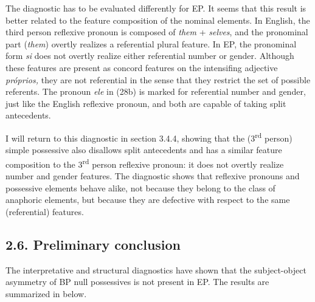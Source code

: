 \documentclass[output=paper]{langsci/langscibook}
\begin{document}
The diagnostic has to be evaluated differently for EP. It seems that this result is better related to the feature composition of the nominal elements. In English, the third person reflexive pronoun is composed of \textit{them} + \textit{selves}, and the pronominal part (\textit{them}) overtly realizes a referential plural feature. In EP, the pronominal form \textit{si} does not overtly realize either referential number or gender. Although these features are present as concord features on the intensifing adjective \textit{próprios,} they are not referential in the sense that they restrict the set of possible referents. The pronoun \textit{ele} in (28b) is marked for referential number and gender, just like the English reflexive pronoun, and both are capable of taking split antecedents.

I will return to this diagnostic in section 3.4.4, showing that the (3\textsuperscript{rd} person) simple possessive also disallows split antecedents and has a similar feature composition to the 3\textsuperscript{rd} person reflexive pronoun: it does not overtly realize number and gender features. The diagnostic shows that reflexive pronouns and possessive elements behave alike, not because they belong to the class of anaphoric elements, but because they are defective with respect to the same (referential) features.

\subsection{ 2.6. Preliminary conclusion}

The interpretative and structural diagnostics have shown that the subject-object asymmetry of BP null possessives is not present in EP. The results are summarized in  below.
\end{document}
